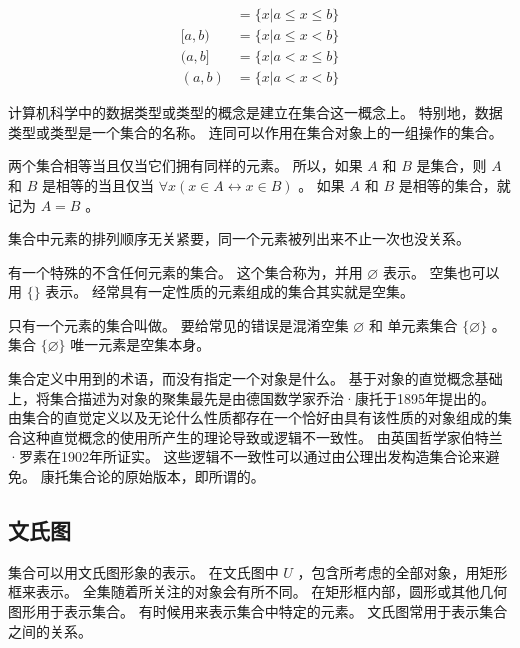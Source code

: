 {{        \begin{align*}
            [a, b] &= \{x | a \leq x \leq b\} \\
            [a, b) &= \{x | a \leq x < b\} \\
            (a, b] &= \{x | a < x \leq b\} \\
            (a, b) &= \{x | a < x < b\}
        \end{align*}

        \begin{defines}
            计算机科学中的数据类型或类型的概念是建立在集合这一概念上。
            特别地，数据类型或类型是一个集合的名称。
            连同可以作用在集合对象上的一组操作的集合。
        \end{defines}

        \begin{defines}
            两个集合相等当且仅当它们拥有同样的元素。
            所以，如果 $A$ 和 $B$ 是集合，则 $A$ 和 $B$ 是相等的当且仅当 $\forall x (x \in A \leftrightarrow x \in B)$ 。
            如果 $A$ 和 $B$ 是相等的集合，就记为 $A = B$ 。
        \end{defines}

        集合中元素的排列顺序无关紧要，同一个元素被列出来不止一次也没关系。

        {
            有一个特殊的不含任何元素的集合。
            这个集合称为，并用 $\varnothing$ 表示。
            空集也可以用 $\{\}$ 表示。
            经常具有一定性质的元素组成的集合其实就是空集。

            只有一个元素的集合叫做。
            要给常见的错误是混淆空集 $\varnothing$ 和 单元素集合 $\{\varnothing\}$ 。
            集合 $\{\varnothing\}$ 唯一元素是空集本身。
        }

        {
            集合定义中用到的术语，而没有指定一个对象是什么。
            基于对象的直觉概念基础上，将集合描述为对象的聚集最先是由德国数学家乔治·康托于1895年提出的。
            由集合的直觉定义以及无论什么性质都存在一个恰好由具有该性质的对象组成的集合这种直觉概念的使用所产生的理论导致或逻辑不一致性。
            由英国哲学家伯特兰·罗素在1902年所证实。
            这些逻辑不一致性可以通过由公理出发构造集合论来避免。
            康托集合论的原始版本，即所谓的。
        }
    }

    \subsection{文氏图}
    {
        集合可以用文氏图形象的表示。
        在文氏图中 $U$ ，包含所考虑的全部对象，用矩形框来表示。
        全集随着所关注的对象会有所不同。
        在矩形框内部，圆形或其他几何图形用于表示集合。
        有时候用来表示集合中特定的元素。
        文氏图常用于表示集合之间的关系。
    }

}

